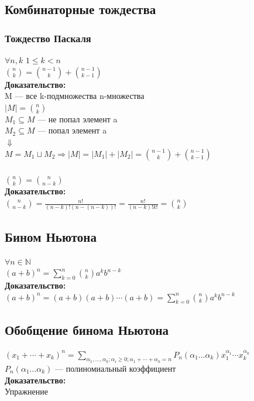 \documentclass[12pt]{article}
\begin{document}
\subsection{Комбинаторные тождества}
\subsubsection{Тождество Паскаля}
	$\forall n,k$ $1 \leqslant k < n$\\
	$\binom{n}{k} = \binom{n-1}{k} + \binom{n-1}{k-1}$\\
	\textbf{Доказательство:}\\
	M — все k-подмножества n-множества\\
	$|M| = \binom{n}{k}$\\
	$M_1 \subseteq M$  — не попал элемент a\\
	$M_2 \subseteq M$  — попал элемент a\\
	$\Downarrow$\\
	$M = M_1 \sqcup M_2 \Rightarrow |M| = |M_1| + |M_2| = \binom{n-1}{k} + \binom{n-1}{k-1}$\\
	\qedsymbol

\subsubsection{}
	$\binom{n}{k} = \binom{n}{n-k}$\\
	\textbf{Доказательство:}\\
	$\binom{n}{n-k} = \frac{n!}{(n-k)!(n-(n-k))!} = \frac{n!}{(n-k)!k!} = \binom{n}{k}$\\
	\qedsymbol

\subsection{Бином Ньютона}
	$\forall n \in \mathbb N$\\
	$(a+b)^n = \displaystyle\sum_{k=0}^n\binom{n}{k}a^kb^{n-k}$\\
	\textbf{Доказательство:}\\
	$(a+b)^n = (a+b)(a+b)\dotsm(a+b) = \displaystyle\sum_{k=0}^n\binom{n}{k}a^kb^{n-k}$\\
	\qedsymbol

\subsection{Обобщение бинома Ньютона}
	$(x_1+\dotsb+x_k)^n = \displaystyle\sum_{\alpha_1,\dotsc,\alpha_k ; \alpha_i \geqslant 0 ; \alpha_1+\dotsb+\alpha_k = n} P_n(\alpha_1\dotsc\alpha_k)x_1^{\alpha_1}\dotsm x_k^{\alpha_k}$\\
	$P_n(\alpha_1\dotsc\alpha_k)$ — полиномиальный коэффициент\\
	\textbf{Доказательство:}\\
	Упражнение\\
	\qedsymbol
\end{document}
